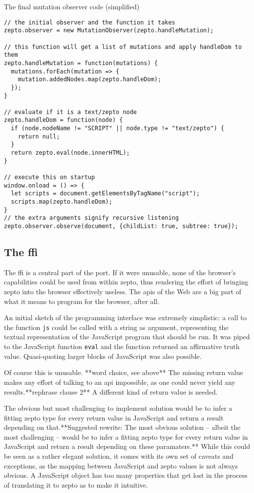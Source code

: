 \documentclass[oneside,11pt,xetex]{scrbook}
\begin{document}
\begin{listing}[H]
\caption{The final mutation observer code (simplified)}
\begin{verbatim}
// the initial observer and the function it takes
zepto.observer = new MutationObserver(zepto.handleMutation);

// this function will get a list of mutations and apply handleDom to them
zepto.handleMutation = function(mutations) {
  mutations.forEach(mutation => {
    mutation.addedNodes.map(zepto.handleDom);
  });
}

// evaluate if it is a text/zepto node
zepto.handleDom = function(node) {
  if (node.nodeName != "SCRIPT" || node.type != "text/zepto") {
    return null;
  }
  return zepto.eval(node.innerHTML);
}

// execute this on startup
window.onload = () => {
  let scripts = document.getElementsByTagName("script");
  scripts.map(zepto.handleDom);
}
// the extra arguments signify recursive listening
zepto.observer.observe(document, {childList: true, subtree: true});
\end{verbatim}
\end{listing}

\subsection{The \gls{ffi}}
\label{sec:ffi}

The \gls{ffi} is a central part of the port. If it were unusable, none of the browser's
capabilities could be used from within zepto, thus rendering the effort of bringing zepto into
the browser effectively useless. The \gls{api}s of the Web are a big part of what it means to
program for the browser, after all.

An initial sketch of the programming interface was extremely simplistic: a call to the
function \texttt{js} could be called with a string as argument, representing the textual
representation of the JavaScript program that should be run. It was piped to the JavaScript
function \texttt{eval} and the function returned an affirmative truth value. Quasi-quoting
larger blocks of JavaScript was also possible.

Of course this is unusable. **word choice, see above** The missing return value makes any effort of talking to an
\gls{api} impossible, as one could never yield any results.**rephrase clause 2** A different kind of return
value is needed.

The obvious but most challenging to implement solution would be to infer a fitting zepto
type for every return value in JavaScript and return a result depending on that.**Suggested rewrite: The most obvious solution – albeit the most challenging – would be to infer a fitting zepto type for every return value in JavaScript and return a result depending on these paramaters.** While
this could be seen as a rather elegant solution, it comes with its own set of caveats
and exceptions, as the mapping between JavaScript and zepto values is not always obvious.
A JavaScript object has too many properties that get lost in the process of translating
it to zepto as to make it intuitive.
\end{document}
